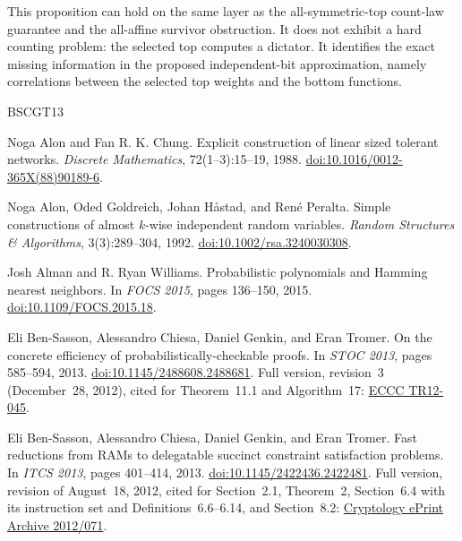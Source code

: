 \documentclass[11pt,letterpaper]{article}
\theoremstyle{definition}
\theoremstyle{remark}
\begin{document}
This proposition can hold on the same layer as the all-symmetric-top
count-law guarantee and the all-affine survivor obstruction.  It does
not exhibit a hard counting problem: the selected top computes a
dictator.  It identifies the exact missing information in the proposed
independent-bit approximation, namely correlations between the selected
top weights and the bottom functions.



\begin{thebibliography}{BSCGT13}
\raggedright

Noga Alon and Fan R. K. Chung.
\newblock Explicit construction of linear sized tolerant networks.
\newblock \emph{Discrete Mathematics}, 72(1--3):15--19, 1988.
\newblock \href{https://doi.org/10.1016/0012-365X(88)90189-6}{doi:10.1016/0012-365X(88)90189-6}.

Noga Alon, Oded Goldreich, Johan H\aa{}stad, and Ren\'e Peralta.
\newblock Simple constructions of almost $k$-wise independent random
  variables.
\newblock \emph{Random Structures \& Algorithms}, 3(3):289--304, 1992.
\newblock \href{https://doi.org/10.1002/rsa.3240030308}{doi:10.1002/rsa.3240030308}.

Josh Alman and R. Ryan Williams.
\newblock Probabilistic polynomials and Hamming nearest neighbors.
\newblock In \emph{FOCS 2015}, pages 136--150, 2015.
\newblock \href{https://doi.org/10.1109/FOCS.2015.18}{doi:10.1109/FOCS.2015.18}.

Eli Ben-Sasson, Alessandro Chiesa, Daniel Genkin, and Eran Tromer.
\newblock On the concrete efficiency of probabilistically-checkable
  proofs.
\newblock In \emph{STOC 2013}, pages 585--594, 2013.
\newblock \href{https://doi.org/10.1145/2488608.2488681}{doi:10.1145/2488608.2488681}.
Full version, revision~3 (December~28, 2012), cited for Theorem~11.1
and Algorithm~17:
\href{https://eccc.weizmann.ac.il/report/2012/045/}{ECCC TR12-045}.

Eli Ben-Sasson, Alessandro Chiesa, Daniel Genkin, and Eran Tromer.
\newblock Fast reductions from RAMs to delegatable succinct constraint
  satisfaction problems.
\newblock In \emph{ITCS 2013}, pages 401--414, 2013.
\newblock \href{https://doi.org/10.1145/2422436.2422481}{doi:10.1145/2422436.2422481}.
Full version, revision of August~18, 2012, cited for Section~2.1,
Theorem~2, Section~6.4 with its instruction set and
Definitions~6.6--6.14, and Section~8.2:
\href{https://eprint.iacr.org/2012/071}{Cryptology ePrint Archive 2012/071}.


\end{thebibliography}
\end{document}
